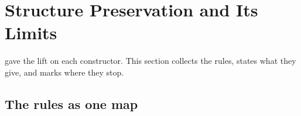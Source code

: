 %

\section{Structure Preservation and Its Limits}
\label{sec:composition-functor}

 gave the lift on each constructor. This section
collects the rules, states what they give, and marks where they stop.

\subsection*{The rules as one map}

